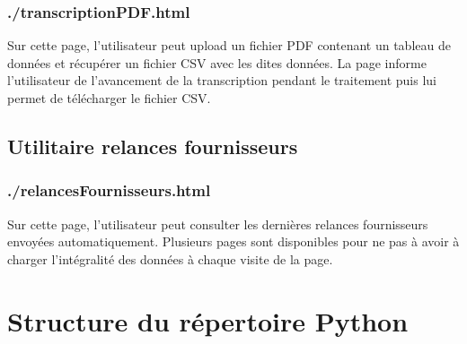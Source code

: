 {\subsection{./transcriptionPDF.html}

Sur cette page, l’utilisateur peut upload un fichier PDF contenant un tableau de données et récupérer un fichier CSV avec les dites données. La page informe l’utilisateur de l’avancement de la transcription pendant le traitement puis lui permet de télécharger le fichier CSV.

\section{Utilitaire relances fournisseurs}

\subsection{./relancesFournisseurs.html}

Sur cette page, l’utilisateur peut consulter les dernières relances fournisseurs envoyées automatiquement. Plusieurs pages sont disponibles pour ne pas à avoir à charger l’intégralité des données à chaque visite de la page.


\chapter{Structure du répertoire Python}

}
